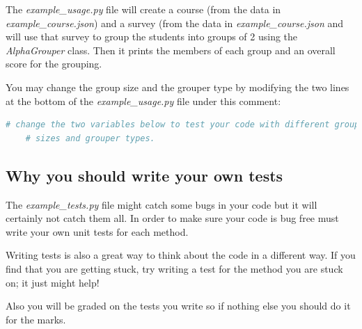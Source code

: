 \documentclass[12pt]{article}
\begin{document}
\bigskip

\noindent The \textit{example\_usage.py} file will create a course (from the
data in \textit{example\_course.json}) and a survey (from the data in
\textit{example\_course.json} and will use that survey to group the students
into groups of 2 using the \textit{AlphaGrouper} class. Then it prints the members
of each group and an overall score for the grouping.

\bigskip

\noindent You may change the group size and the grouper type by modifying the
two lines at the bottom of the \textit{example\_usage.py} file under this comment:

\bigskip

\begin{lstlisting}[language=python]
    # change the two variables below to test your code with different group
    # sizes and grouper types.
\end{lstlisting}

\bigskip

\subsection*{Why you should write your own tests}
The \textit{example\_tests.py} file might catch some bugs in your code but it
will certainly not catch them all. In order to make sure your code is bug free
must write your own unit tests for each method.

\bigskip

\noindent Writing tests is also a great way to think about the code in a different
way. If you find that you are getting stuck, try writing a test for the method
you are stuck on; it just might help!

\bigskip

\noindent Also you will be graded on the tests you write so if nothing else you
should do it for the marks.
\end{document}
